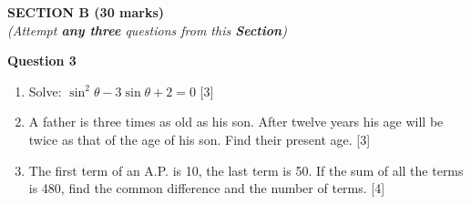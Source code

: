 \newpage
\begin{center}
   \large
   \textbf{SECTION B (30 marks)}\\
   \vspace{5mm}
   \normalsize
   \textit{(Attempt \textbf{any three} questions from this \textbf{Section})}
\end{center}
\par

\noindent
\textbf{Question 3}
\begin{enumerate}[label=(\roman*)]

    \item Solve: $\sin^2 \theta - 3 \sin \theta + 2 = 0$ \hfill [3]

    \item A father is three times as old as his son. After twelve 
        years his age will be twice as that of the age of his son. 
        Find their present age. \hfill [3]

    \item The first term of an A.P. is 10, the last term is 50. If 
        the sum of all the terms is 480, find the common difference
        and the number of terms. \hfill [4]

\end{enumerate}

